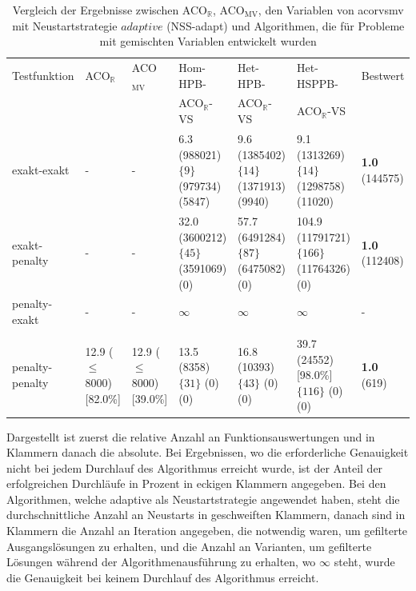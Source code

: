 \documentclass[fontsize=12, a4aper]{scrartcl}
\begin{document}
	\begin{table}[H]
		
		\caption{Vergleich der Ergebnisse zwischen ACO\(_\mathbb{R}\), ACO\(_\text{MV}\), den Variablen von \acl{acorvsmv} mit Neustartstrategie \(adaptive\) (NSS-adapt) und Algorithmen, die für Probleme mit gemischten Variablen entwickelt wurden}
		
		\label{subsubsec:Vergleich_Von_ACO_R_ACO_R_Very_Simple_Und_Iterationen:tab:Vergleich_CSD_adaptive}
		
		\scriptsize
		
		\begin{tabularx}{\linewidth}{l X X X X X X}
			
			\toprule
			
			Testfunktion & ACO\(_\mathbb{R}\) & ACO\(_{\text{MV}}\) & Hom-HPB- & Het-HPB- & Het-HSPPB- & Bestwert\\
						 & 					  &						& ACO\(_\mathbb{R}\)-VS & ACO\(_\mathbb{R}\)-VS & ACO\(_\mathbb{R}\)-VS & \\
			
			\midrule
			
			exakt-exakt & - & - & 6.3 (988021) \(\{9\}\) (979734) (5847) & 9.6 (1385402) \(\{14\}\) (1371913) (9940) & 9.1 (1313269) \(\{14\}\) (1298758) (11020) & \textbf{1.0} (144575)\\
			
			exakt-penalty & - & - & 32.0 (3600212) \(\{45\}\) (3591069) (0) & 57.7 (6491284) \(\{87\}\) (6475082) (0) & 104.9 (11791721) \(\{166\}\) (11764326) (0) & \textbf{1.0} (112408)\\
			
			penalty-exakt & - & - & \(\infty\) & \(\infty\) & \(\infty\) & - \\
			
			 & & & & & & \\
			
			penalty-penalty & 12.9 (\(\leq\)8000) [82.0\%] & 12.9 (\(\leq\)8000) [39.0\%] & 13.5 (8358) \(\{31\}\) (0) (0) & 16.8 (10393) \(\{43\}\) (0) (0) & 39.7 (24552) [98.0\%] \(\{116\}\) (0) (0) & \textbf{1.0} (619)\\
			
			\bottomrule
			
		\end{tabularx}
		
		\smallskip
		
		Dargestellt ist zuerst die relative Anzahl an Funktionsauswertungen und in Klammern danach die absolute. Bei Ergebnissen, wo die erforderliche Genauigkeit nicht bei jedem Durchlauf des Algorithmus erreicht wurde, ist der Anteil der erfolgreichen Durchläufe in Prozent in eckigen Klammern angegeben. Bei den Algorithmen, welche \glqq adaptive\grqq{} als Neustartstrategie angewendet haben, steht die durchschnittliche Anzahl an Neustarts in geschweiften Klammern, danach sind in Klammern die Anzahl an Iteration angegeben, die notwendig waren, um gefilterte Ausgangslösungen zu erhalten, und die Anzahl an Varianten, um gefilterte Lösungen während der Algorithmenausführung zu erhalten, wo \(\infty\) steht, wurde die Genauigkeit bei keinem Durchlauf des Algorithmus erreicht.\hfill\newline
		

\end{table}
\end{document}
